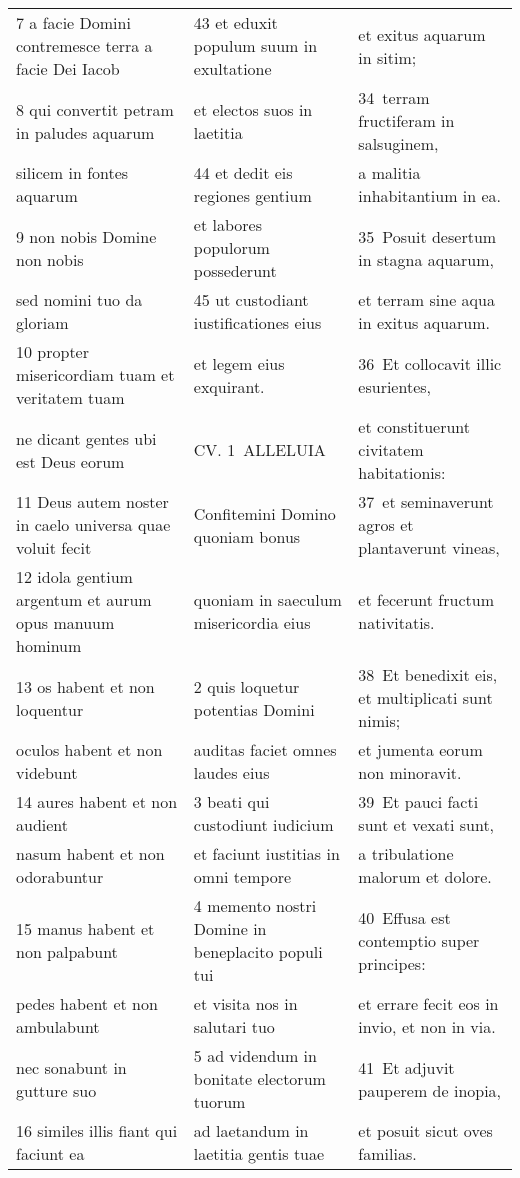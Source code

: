 \documentclass{article}
\begin{document}
\begin{longtable}{@{}p{}p{}p{}@{}}
7 a facie Domini contremesce terra a facie Dei Iacob	&	43 et eduxit populum suum in exultatione	&	et exitus aquarum in sitim;	\\
8 qui convertit petram in paludes aquarum	&	et electos suos in laetitia	&	34 terram fructiferam in salsuginem,	\\
silicem in fontes aquarum	&	44 et dedit eis regiones gentium	&	a malitia inhabitantium in ea.	\\
9 non nobis Domine non nobis	&	et labores populorum possederunt	&	35 Posuit desertum in stagna aquarum,	\\
sed nomini tuo da gloriam	&	45 ut custodiant iustificationes eius	&	et terram sine aqua in exitus aquarum.	\\
10 propter misericordiam tuam et veritatem tuam	&	et legem eius exquirant.	&	36 Et collocavit illic esurientes,	\\
ne dicant gentes ubi est Deus eorum	&	CV. 1 ALLELUIA	&	et constituerunt civitatem habitationis:	\\
11 Deus autem noster in caelo universa quae voluit fecit	&	Confitemini Domino quoniam bonus	&	37 et seminaverunt agros et plantaverunt vineas,	\\
12 idola gentium argentum et aurum opus manuum hominum	&	quoniam in saeculum misericordia eius	&	et fecerunt fructum nativitatis.	\\
13 os habent et non loquentur	&	2 quis loquetur potentias Domini	&	38 Et benedixit eis, et multiplicati sunt nimis;	\\
oculos habent et non videbunt	&	auditas faciet omnes laudes eius	&	et jumenta eorum non minoravit.	\\
14 aures habent et non audient	&	3 beati qui custodiunt iudicium	&	39 Et pauci facti sunt et vexati sunt,	\\
nasum habent et non odorabuntur	&	et faciunt iustitias in omni tempore	&	a tribulatione malorum et dolore.	\\
15 manus habent et non palpabunt	&	4 memento nostri Domine in beneplacito populi tui	&	40 Effusa est contemptio super principes:	\\
pedes habent et non ambulabunt	&	et visita nos in salutari tuo	&	et errare fecit eos in invio, et non in via.	\\
nec sonabunt in gutture suo	&	5 ad videndum in bonitate electorum tuorum	&	41 Et adjuvit pauperem de inopia,	\\
16 similes illis fiant qui faciunt ea	&	ad laetandum in laetitia gentis tuae	&	et posuit sicut oves familias.	\\

\end{longtable}
\end{document}
